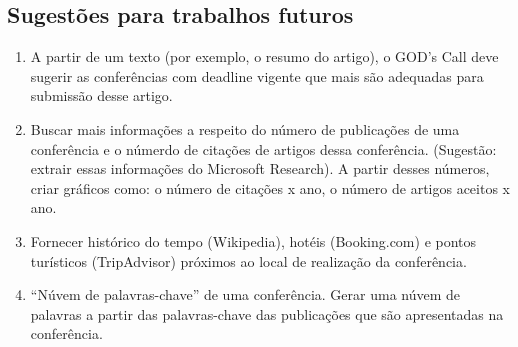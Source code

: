 \subsection{Sugestões para trabalhos futuros}
\begin{enumerate}
	\item A partir de um texto (por exemplo, o resumo do artigo), o GOD's Call deve sugerir as conferências com deadline vigente que mais são adequadas para submissão desse artigo. 
    \item Buscar mais informações a respeito do número de publicações de uma conferência e o númerdo de citações de artigos dessa conferência. (Sugestão: extrair essas informações do Microsoft Research). A partir desses números, criar gráficos como: o número de citações x ano, o número de artigos aceitos x ano.
    \item Fornecer histórico do tempo (Wikipedia), hotéis (Booking.com) e pontos turísticos (TripAdvisor) próximos ao local de realização da conferência.	
    \item  ``Núvem de palavras-chave'' de uma conferência. Gerar uma núvem de palavras a partir das palavras-chave das publicações que são apresentadas na conferência.
\end{enumerate}

